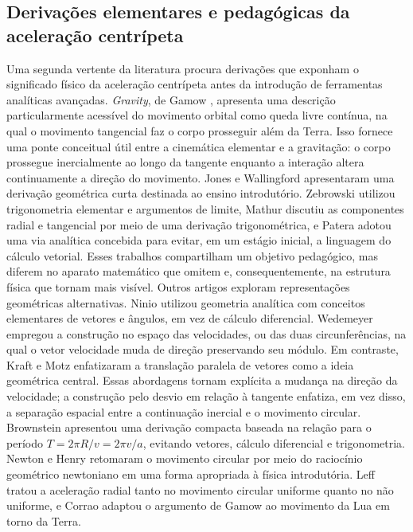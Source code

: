 \documentclass[12pt,a4paper]{article}
\numberwithin{equation}{section}
\theoremstyle{remark}
\begin{document}
\subsection{Derivações elementares e pedagógicas da aceleração centrípeta}

Uma segunda vertente da literatura procura derivações que exponham o significado físico da aceleração centrípeta antes da introdução de ferramentas analíticas avançadas. \textit{Gravity}, de Gamow \cite{gamow1962gravity}, apresenta uma descrição particularmente acessível do movimento orbital como queda livre contínua, na qual o movimento tangencial faz o corpo prosseguir além da Terra. Isso fornece uma ponte conceitual útil entre a cinemática elementar e a gravitação: o corpo prossegue inercialmente ao longo da tangente enquanto a interação altera continuamente a direção do movimento. Jones e Wallingford \cite{jones1969simple} apresentaram uma derivação geométrica curta destinada ao ensino introdutório. Zebrowski \cite{zebrowski1972derivation} utilizou trigonometria elementar e argumentos de limite, Mathur \cite{Mathur1974} discutiu as componentes radial e tangencial por meio de uma derivação trigonométrica, e Patera \cite{patera1975deriving} adotou uma via analítica concebida para evitar, em um estágio inicial, a linguagem do cálculo vetorial. Esses trabalhos compartilham um objetivo pedagógico, mas diferem no aparato matemático que omitem e, consequentemente, na estrutura física que tornam mais visível. Outros artigos exploram representações geométricas alternativas. Ninio \cite{ninio1993} utilizou geometria analítica com conceitos elementares de vetores e ângulos, em vez de cálculo diferencial. Wedemeyer \cite{wedemeyer1993centripetal} empregou a construção no espaço das velocidades, ou das duas circunferências, na qual o vetor velocidade muda de direção preservando seu módulo.
Em contraste, Kraft e Motz \cite{kraft1995geometric} enfatizaram a translação paralela de vetores como a ideia geométrica central. Essas abordagens tornam explícita a mudança na direção da velocidade; a construção pelo desvio em relação à tangente enfatiza, em vez disso, a separação espacial entre a continuação inercial e o movimento circular. Brownstein \cite{brownstein1994simple} apresentou uma derivação compacta baseada na relação para o período $T=2\pi R/v=2\pi v/a$, evitando vetores, cálculo diferencial e trigonometria. Newton e Henry \cite{newton2000circular} retomaram o movimento circular por meio do raciocínio geométrico newtoniano em uma forma apropriada à física introdutória. Leff \cite{leff2002acceleration} tratou a aceleração radial tanto no movimento circular uniforme quanto no não uniforme, e Corrao \cite{corrao2012gamow} adaptou o argumento de Gamow ao movimento da Lua em torno da Terra.
\end{document}
